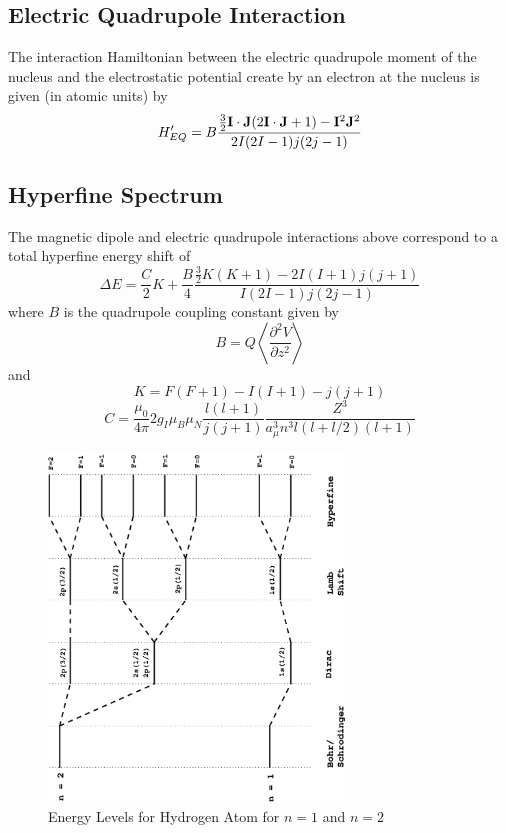 \documentclass[a4paper]{IEEEtran}
\begin{document}
    \subsection{Electric Quadrupole Interaction}
    The interaction Hamiltonian between the electric quadrupole moment of the
    nucleus and the electrostatic potential create by an electron at the nucleus is 
    given (in atomic units) by
    \begin{equation}
        H'_{EQ} = B \frac{\frac{3}{2}{\bf I} \cdot {\bf J} (2{\bf I}\cdot {\bf J} + 1) - 
                        {\bf I}^2 {\bf J}^2} {2I(2I-1)j(2j-1)}    
    \end{equation}

    \subsection{Hyperfine Spectrum}
    The magnetic dipole and electric quadrupole interactions above correspond to 
    a total hyperfine energy shift of
    \begin{equation}
        \Delta E = \frac{C}{2}K + \frac{B}{4} 
                   \frac{\frac{3}{2}K(K+1)-2I(I+1)j(j+1)}{I(2I-1)j(2j-1)}
    \end{equation}
    where $B$ is the quadrupole coupling constant given by
    \begin{equation}
        B = Q \left \langle \frac{\partial^2 V}{\partial z^2} \right \rangle
    \end{equation}
    and
    \begin{equation}
        K = F(F+1) - I(I+1) - j(j+1)
    \end{equation}
    \begin{equation}
         C = \frac{\mu_0}{4\pi} 2g_I \mu_B \mu_N \frac{l(l+1)}{j(j+1)}
            \frac{Z^3}{a_{\mu}^{3} n^3 l (l + l/2)(l+1)} 
    \end{equation}

    \begin{figure}[!t]  
        \centering
        \includegraphics[angle=-90,width=0.7\textwidth]{all.eps}
        \caption{Energy Levels for Hydrogen Atom for $n=1$ and $n=2$}
        \label{fig:split} 
    \end{figure} 
\end{document}
